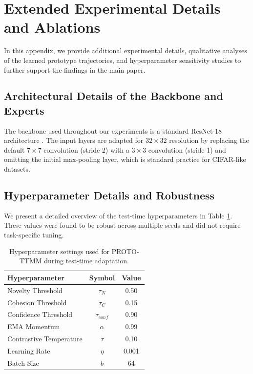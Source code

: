 \documentclass[twoside]{article}
\begin{document}
\nocite{*}



\newpage
\appendix
\onecolumn
\section{Extended Experimental Details and Ablations}

In this appendix, we provide additional experimental details, qualitative analyses of the learned prototype trajectories, and hyperparameter sensitivity studies to further support the findings in the main paper.

\subsection{Architectural Details of the Backbone and Experts}
The backbone used throughout our experiments is a standard ResNet-18 architecture \cite{resnet2026}. The input layers are adapted for $32 \times 32$ resolution by replacing the default $7 \times 7$ convolution (stride 2) with a $3 \times 3$ convolution (stride 1) and omitting the initial max-pooling layer, which is standard practice for CIFAR-like datasets.

\subsection{Hyperparameter Details and Robustness}
We present a detailed overview of the test-time hyperparameters in Table \ref{tab:hyperparams}. These values were found to be robust across multiple seeds and did not require task-specific tuning.

\begin{table}[h]
\caption{Hyperparameter settings used for PROTO-TTMM during test-time adaptation.}
\label{tab:hyperparams}
\centering
\begin{tabular}{lcc}
\toprule
Hyperparameter & Symbol & Value \\
\midrule
Novelty Threshold & $\tau_N$ & 0.50 \\
Cohesion Threshold & $\tau_C$ & 0.15 \\
Confidence Threshold & $\tau_{conf}$ & 0.90 \\
EMA Momentum & $\alpha$ & 0.99 \\
Contrastive Temperature & $\tau$ & 0.10 \\
Learning Rate & $\eta$ & 0.001 \\
Batch Size & $b$ & 64 \\
\bottomrule
\end{tabular}
\end{table}
\end{document}
